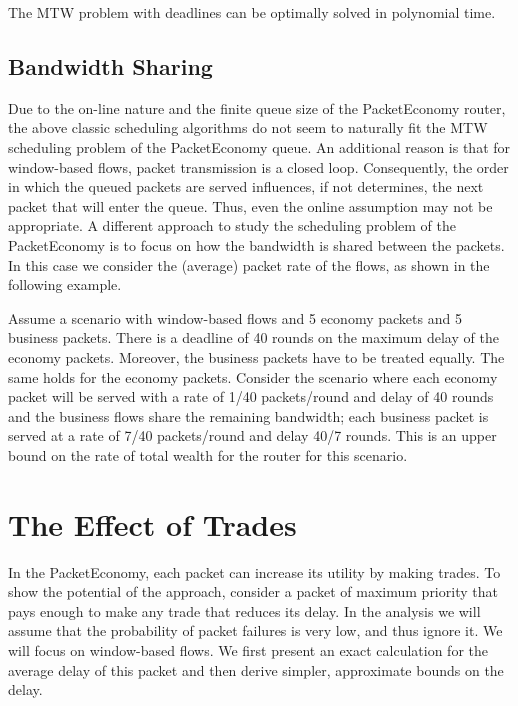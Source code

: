 \documentclass[letterpaper,10pt]{llncs}
\newcommand{\hla}[1]{\hl{#1}}
\renewcommand{\hla}[1]{#1}
\begin{document}
\begin{theorem}
The MTW problem with deadlines can be optimally solved in polynomial time.
\end{theorem}

\subsection{Bandwidth Sharing}
Due to the on-line nature and the finite queue size of the PacketEconomy router, 
the above classic scheduling algorithms do not seem to naturally fit the 
MTW scheduling problem of the PacketEconomy queue. An additional reason is that
for window-based flows, packet transmission is a closed loop. 
Consequently, the order in which the queued packets are served influences, if not determines,
the next packet that will enter the queue. Thus, even the online assumption may not be appropriate.
\hla{A different approach to study the scheduling problem of the PacketEconomy is to 
focus on how the bandwidth is shared between the packets.} In this case we consider the 
(average) packet rate of the flows, as shown in the following example.

\begin{example}
\label{exa:rates}
Assume a scenario with window-based flows and 5 economy packets and 5 business packets.
There is a deadline of 40 rounds on the maximum delay of the economy packets.
Moreover, the business packets have to be treated equally. The same holds for 
the economy packets. Consider the scenario where each economy packet will be served
with a rate of 1/40 packets/round and delay of 40 rounds and the business flows share 
the remaining bandwidth; each business packet is served at a rate of 7/40 packets/round
and delay 40/7 rounds. This is an upper bound on the rate of total wealth for the router
for this scenario. 
\end{example}

\section{The Effect of Trades}
\label{sec:effect}

In the PacketEconomy, each packet can increase its utility by making trades. 
To show the potential
of the approach, consider a packet of maximum priority that pays enough to 
make any trade that reduces its delay.
In the analysis we will assume that the probability of packet failures is very low, 
and thus ignore it. We will focus on window-based flows.
We first present an exact calculation for the average delay of this packet 
and then derive simpler, approximate bounds on the delay.
\end{document}

